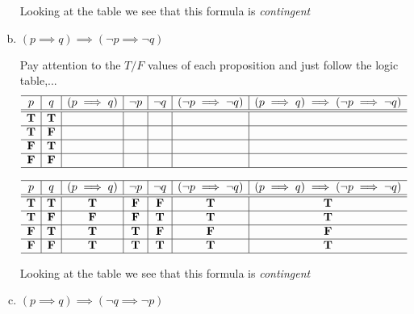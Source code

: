 \begin{problem}
\begin{enumerate}[a.]
\begin{minipage}{0.75\textwidth}
Looking at the table we see that this formula is \emph{contingent}
    \end{minipage}
        \color{black}
    \fi

\item $(p \implies q) \implies (\neg p \implies \neg q)$

Pay attention to the $T/F$ values of each proposition and just follow the logic table,...
 $$\begin{array}{c|c|c|c|c|c|c}
  \hline  
  p & q &(p \implies q)&\neg p & \neg q& (\neg p \implies \neg q)	& (p \implies q) \implies (\neg p \implies \neg q) \\
  \hline
  \hline
 \mathbf{T} &  \mathbf{T} 	& 	& 	& 	&	 & 	\\
  \hline
 \mathbf{T} &  \mathbf{F} 	&  	&  	& 	& 	& 	\\
  \hline
 \mathbf{F} &  \mathbf{T} 	&  	&  	& 	& 	&  	\\
   \hline
 \mathbf{F} &  \mathbf{F} 	&  	&   	& 	& 	&  	\\
    \hline
    \end{array}$$



\ifKey
\color{red}
\hfill\begin{minipage}{0.75\textwidth}
 $\begin{array}{c|c|c|c|c|c|c}
  \hline  
  p & q &(p \implies q)&\neg p & \neg q& (\neg p \implies \neg q)&(p \implies q) \implies (\neg p \implies \neg q)\\
  \hline
  \hline
 \mathbf{T} &  \mathbf{T} 	&  \mathbf{T} 	&  \mathbf{F}	&  \mathbf{F}	&  \mathbf{T} 	&  \mathbf{T} 	\\
  \hline
 \mathbf{T} &  \mathbf{F} 	&  \mathbf{F} 	&  \mathbf{F}	&	  \mathbf{T} 	&  \mathbf{T} 	&  \mathbf{T} 	\\
  \hline
 \mathbf{F} &  \mathbf{T} 	&  \mathbf{T}  	&  \mathbf{T}	&	  \mathbf{F}	&  \mathbf{F} 	&  \mathbf{F} 	\\
   \hline
 \mathbf{F} &  \mathbf{F} 	&  \mathbf{T}  	&  \mathbf{T}	&	  \mathbf{T}	&  \mathbf{T} 	&  \mathbf{T} 	\\
    \hline
    \end{array}$
    
Looking at the table we see that this formula is \emph{contingent}
    \end{minipage}
        \color{black}
    \fi


\item $(p \implies q) \implies (\neg q \implies \neg p)$


\end{enumerate}
\end{problem}
